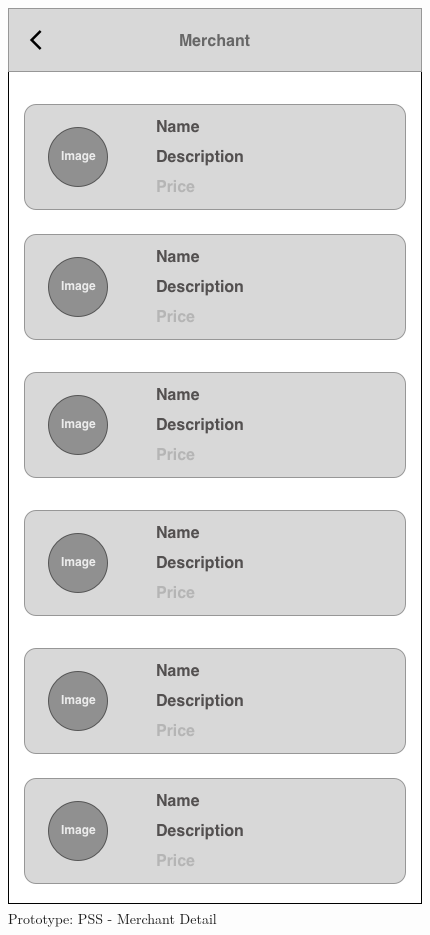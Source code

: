\begin{figure}[ht]
    \centering
    \includegraphics[scale=0.50]{../images/prototype-pss-details.png}
    \caption{Prototype: PSS - Merchant Detail}
    \label{fig:pss-prototype-details}
\end{figure}

